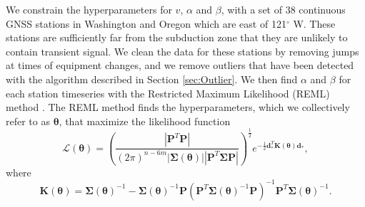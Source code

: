 \documentclass[10pt,a4paper]{article}
\begin{document}
We constrain the hyperparameters for $v$, $\alpha$ and $\beta$, with a set of 38 continuous GNSS stations in Washington and Oregon which are east of 121$^\circ$ W.  These stations are sufficiently far from the subduction zone that they are unlikely to contain transient signal.  We clean the data for these stations by removing jumps at times of equipment changes, and we remove outliers that have been detected with the algorithm described in Section \ref{sec:Outlier}. We then find $\alpha$ and $\beta$ for each station timeseries with the Restricted Maximum Likelihood (REML) method \cite[e.g.,][]{Harville1974,Cressie1992}. The REML method finds the hyperparameters, which we collectively refer to as $\bm{\theta}$, that maximize the likelihood function
\begin{equation}\label{eq:REML}
\mathcal{L}(\bm{\theta}) = \left(\frac{\left|\bm{P}^T\bm{P}\right|}
                           {(2\pi)^{n-6m} 
                           \left| \bm{\Sigma}(\bm{\theta}) \right| 
                           \left| \bm{P}^T\bm{\Sigma}\bm{P} \right|}\right)^{\frac{1}{2}} 
                           e^{-\tfrac{1}{2}\bm{d}_*^T\bm{K}(\bm{\theta})\bm{d}_*},
\end{equation}
where
\begin{equation}
\bm{K}(\bm{\theta}) = \bm{\Sigma}(\bm{\theta})^{-1} - 
                      \bm{\Sigma}(\bm{\theta})^{-1}\bm{P}
         \left(\bm{P}^T\bm{\Sigma}(\bm{\theta})^{-1}\bm{P}\right)^{-1}
         \bm{P}^T\bm{\Sigma}(\bm{\theta})^{-1}.
\end{equation}
\end{document}
